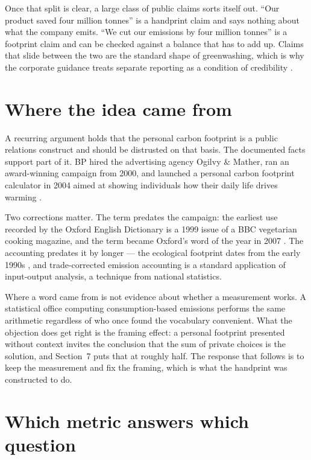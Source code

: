 \documentclass[11pt,a4paper]{article}
\begin{document}
Once that split is clear, a large class of public claims sorts itself out.
\enquote{Our product saved four million tonnes} is a handprint claim and says nothing
about what the company emits. \enquote{We cut our emissions by four million tonnes}
is a footprint claim and can be checked against a balance that has to add up. Claims
that slide between the two are the standard shape of greenwashing, which is why the
corporate guidance treats separate reporting as a condition of credibility
\cite{wbcsd}.

\section{Where the idea came from}

A recurring argument holds that the personal carbon footprint is a public relations
construct and should be distrusted on that basis. The documented facts support part
of it. BP hired the advertising agency Ogilvy \& Mather, ran an award-winning
campaign from 2000, and launched a personal carbon footprint calculator in 2004
aimed at showing individuals how their daily life drives warming \cite{mashable}.

Two corrections matter. The term predates the campaign: the earliest use recorded by
the Oxford English Dictionary is a 1999 issue of a BBC vegetarian cooking magazine,
and the term became Oxford's word of the year in 2007 \cite{euronews}. The accounting
predates it by longer — the ecological footprint dates from the early 1990s
\cite{gfn-data}, and trade-corrected emission accounting is a standard application of
input-output analysis, a technique from national statistics.

Where a word came from is not evidence about whether a measurement works. A
statistical office computing consumption-based emissions performs the same arithmetic
regardless of who once found the vocabulary convenient. What the objection does get
right is the framing effect: a personal footprint presented without context invites
the conclusion that the sum of private choices is the solution, and Section~7 puts
that at roughly half. The response that follows is to keep the measurement and fix
the framing, which is what the handprint was constructed to do.

\section{Which metric answers which question}
\end{document}
